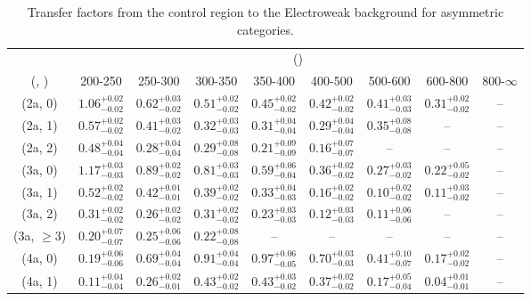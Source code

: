 \begin{table}[h!]
\tiny
\centering
\caption{Transfer factors from the \mj control region to the Electroweak background for asymmetric categories.\label{tab:tf_mu_total_asym}}
\begin{tabular}
{ccccccccc}
	\hline\hline
	& \multicolumn{8}{c}{\scalht (\gev)} \\ 
	 (\njet,  \nb) & 200-250 & 250-300 & 300-350 & 350-400 & 400-500 & 500-600 & 600-800 & 800-$\infty$ \\ [0.8ex] 
\hline
	(2a, 0) & $1.06^{+ 0.02 }_{- 0.02 }$ & $0.62^{+ 0.03 }_{- 0.02 }$ & $0.51^{+ 0.02 }_{- 0.02 }$ & $0.45^{+ 0.02 }_{- 0.02 }$ & $0.42^{+ 0.02 }_{- 0.02 }$ & $0.41^{+ 0.03 }_{- 0.03 }$ & $0.31^{+ 0.02 }_{- 0.02 }$ & -- \\[0.5ex] 
	(2a, 1) & $0.57^{+ 0.02 }_{- 0.02 }$ & $0.41^{+ 0.03 }_{- 0.02 }$ & $0.32^{+ 0.03 }_{- 0.03 }$ & $0.31^{+ 0.04 }_{- 0.04 }$ & $0.29^{+ 0.04 }_{- 0.04 }$ & $0.35^{+ 0.08 }_{- 0.08 }$ & -- & -- \\[0.5ex] 
	(2a, 2) & $0.48^{+ 0.04 }_{- 0.04 }$ & $0.28^{+ 0.04 }_{- 0.04 }$ & $0.29^{+ 0.08 }_{- 0.08 }$ & $0.21^{+ 0.09 }_{- 0.09 }$ & $0.16^{+ 0.07 }_{- 0.07 }$ & -- & -- & -- \\[0.5ex] 
	(3a, 0) & $1.17^{+ 0.03 }_{- 0.03 }$ & $0.89^{+ 0.02 }_{- 0.02 }$ & $0.81^{+ 0.03 }_{- 0.03 }$ & $0.59^{+ 0.06 }_{- 0.04 }$ & $0.36^{+ 0.02 }_{- 0.02 }$ & $0.27^{+ 0.03 }_{- 0.02 }$ & $0.22^{+ 0.05 }_{- 0.02 }$ & -- \\[0.5ex] 
	(3a, 1) & $0.52^{+ 0.02 }_{- 0.02 }$ & $0.42^{+ 0.01 }_{- 0.01 }$ & $0.39^{+ 0.02 }_{- 0.02 }$ & $0.33^{+ 0.04 }_{- 0.03 }$ & $0.16^{+ 0.02 }_{- 0.02 }$ & $0.10^{+ 0.02 }_{- 0.02 }$ & $0.11^{+ 0.03 }_{- 0.02 }$ & -- \\[0.5ex] 
	(3a, 2) & $0.31^{+ 0.02 }_{- 0.02 }$ & $0.26^{+ 0.02 }_{- 0.02 }$ & $0.31^{+ 0.02 }_{- 0.02 }$ & $0.23^{+ 0.03 }_{- 0.03 }$ & $0.12^{+ 0.03 }_{- 0.03 }$ & $0.11^{+ 0.06 }_{- 0.06 }$ & -- & -- \\[0.5ex] 
	(3a, $\ge3$) & $0.20^{+ 0.07 }_{- 0.07 }$ & $0.25^{+ 0.06 }_{- 0.06 }$ & $0.22^{+ 0.08 }_{- 0.08 }$ & -- & -- & -- & -- & -- \\[0.5ex] 
	(4a, 0) & $0.19^{+ 0.06 }_{- 0.06 }$ & $0.69^{+ 0.04 }_{- 0.04 }$ & $0.91^{+ 0.04 }_{- 0.04 }$ & $0.97^{+ 0.06 }_{- 0.05 }$ & $0.70^{+ 0.03 }_{- 0.03 }$ & $0.41^{+ 0.10 }_{- 0.07 }$ & $0.17^{+ 0.02 }_{- 0.02 }$ & -- \\[0.5ex] 
	(4a, 1) & $0.11^{+ 0.04 }_{- 0.04 }$ & $0.26^{+ 0.02 }_{- 0.01 }$ & $0.43^{+ 0.02 }_{- 0.02 }$ & $0.43^{+ 0.03 }_{- 0.02 }$ & $0.37^{+ 0.02 }_{- 0.02 }$ & $0.17^{+ 0.05 }_{- 0.04 }$ & $0.04^{+ 0.01 }_{- 0.01 }$ & -- \\[0.5ex] 

\end{tabular}
\end{table}

